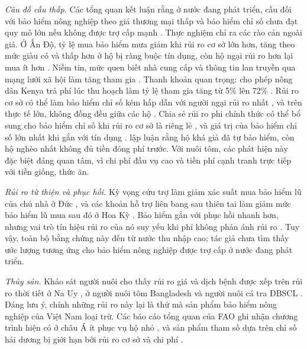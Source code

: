 \documentclass[12pt,a4paper]{article}
\begin{document}
\textit{Câu đố cầu thấp.} Các tổng quan kết luận rằng ở nước đang phát triển, cầu đối với bảo hiểm nông nghiệp theo giá thương mại thấp và bảo hiểm chỉ số chưa đạt quy mô lớn nếu không được trợ cấp mạnh \parencite{colexiong2017,carter2017}. Thực nghiệm chỉ ra các rào cản ngoài giá. Ở Ấn Độ, tỷ lệ mua bảo hiểm mưa giảm khi rủi ro cơ sở lớn hơn, tăng theo mức giàu có và thấp hơn ở hộ bị ràng buộc tín dụng, còn hộ ngại rủi ro hơn lại mua ít hơn \parencite{gine2008}. Niềm tin, mức quen biết nhà cung cấp và thông tin lan truyền qua mạng lưới xã hội làm tăng tham gia \parencite{gine2008,cai2015}. Thanh khoản quan trọng: cho phép nông dân Kenya trả phí lúc thu hoạch làm tỷ lệ tham gia tăng từ 5\% lên 72\% \parencite{casaburi2018}. Rủi ro cơ sở có thể làm bảo hiểm chỉ số kém hấp dẫn với người ngại rủi ro nhất \parencite{clarke2016}, và trên thực tế lớn, không đồng đều giữa các hộ \parencite{jensen2016}. Chia sẻ rủi ro phi chính thức có thể bổ sung cho bảo hiểm chỉ số khi rủi ro cơ sở là riêng lẻ \parencite{mobarak2013}, và giá trị của bảo hiểm chỉ số lớn nhất khi gắn với tín dụng \parencite{carter2016}. \textcite{binswanger2012} lập luận rằng hộ khá giả đã tự bảo hiểm, còn hộ nghèo nhất không đủ tiền đóng phí trước. Với nuôi tôm, các phát hiện này đặc biệt đáng quan tâm, vì chi phí đầu vụ cao và tiền phí cạnh tranh trực tiếp với tiền giống, thức ăn.

\textit{Rủi ro từ thiện và phục hồi.} Kỳ vọng cứu trợ làm giảm xác suất mua bảo hiểm lũ của chủ nhà ở Đức \parencite{andor2020}, và các khoản hỗ trợ liên bang sau thiên tai làm giảm mức bảo hiểm lũ mua sau đó ở Hoa Kỳ \parencite{kousky2018}. Bảo hiểm gắn với phục hồi nhanh hơn, nhưng vai trò tín hiệu rủi ro của nó suy yếu khi phí không phản ánh rủi ro \parencite{kousky2019}. Tuy vậy, toàn bộ bằng chứng này đến từ nước thu nhập cao; tác giả chưa tìm thấy ước lượng tương ứng cho bảo hiểm nông nghiệp được trợ cấp ở nước đang phát triển.

\textit{Thủy sản.} Khảo sát người nuôi cho thấy rủi ro giá và dịch bệnh được xếp trên rủi ro thời tiết ở Na Uy \parencite{bergfjord2009}, ở người nuôi tôm Bangladesh \parencite{ahsan2011} và người nuôi cá tra ĐBSCL \parencite{lecheong2010}. Đáng lưu ý, chính những rủi ro này lại là thứ mà sản phẩm bảo hiểm nông nghiệp của Việt Nam loại trừ. Các báo cáo tổng quan của FAO ghi nhận chương trình hiện có ở châu Á ít phục vụ hộ nhỏ \parencite{vananrooy2006,secretan2007}, và sản phẩm tham số dựa trên chỉ số hải dương bị giới hạn bởi rủi ro cơ sở và chi phí \parencite{hobday2025}.
\end{document}
